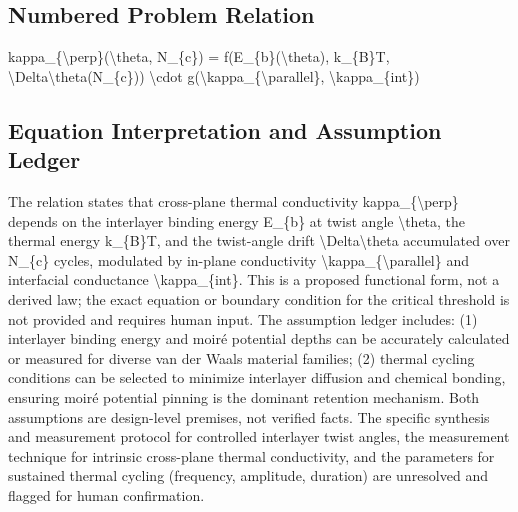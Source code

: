 \documentclass[conference]{IEEEtran}
\begin{document}
\subsection{Numbered Problem Relation}
kappa\_\{\textbackslash{}perp\}(\textbackslash{}theta, N\_\{c\}) = f(E\_\{b\}(\textbackslash{}theta), k\_\{B\}T, \textbackslash{}Delta\textbackslash{}theta(N\_\{c\})) \textbackslash{}cdot g(\textbackslash{}kappa\_\{\textbackslash{}parallel\}, \textbackslash{}kappa\_\{int\})

\subsection{Equation Interpretation and Assumption Ledger}
The relation states that cross-plane thermal conductivity kappa\_\{\textbackslash{}perp\} depends on the interlayer binding energy E\_\{b\} at twist angle \textbackslash{}theta, the thermal energy k\_\{B\}T, and the twist-angle drift \textbackslash{}Delta\textbackslash{}theta accumulated over N\_\{c\} cycles, modulated by in-plane conductivity \textbackslash{}kappa\_\{\textbackslash{}parallel\} and interfacial conductance \textbackslash{}kappa\_\{int\}. This is a proposed functional form, not a derived law; the exact equation or boundary condition for the critical threshold is not provided and requires human input. The assumption ledger includes: (1) interlayer binding energy and moiré potential depths can be accurately calculated or measured for diverse van der Waals material families; (2) thermal cycling conditions can be selected to minimize interlayer diffusion and chemical bonding, ensuring moiré potential pinning is the dominant retention mechanism. Both assumptions are design-level premises, not verified facts. The specific synthesis and measurement protocol for controlled interlayer twist angles, the measurement technique for intrinsic cross-plane thermal conductivity, and the parameters for sustained thermal cycling (frequency, amplitude, duration) are unresolved and flagged for human confirmation.
\end{document}
